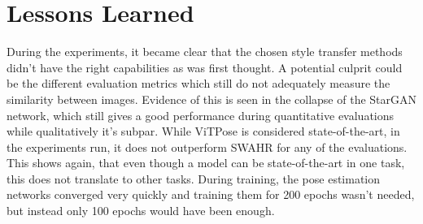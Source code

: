 \section{Lessons Learned}
During the experiments, it became clear that the chosen style transfer methods didn't have the right capabilities as was first thought.
A potential culprit could be the different evaluation metrics which still do not adequately measure the similarity between images.
Evidence of this is seen in the collapse of the StarGAN network, which still gives a good performance during quantitative evaluations while qualitatively it's subpar.
While ViTPose is considered state-of-the-art, in the experiments run, it does not outperform SWAHR for any of the evaluations.
This shows again, that even though a model can be state-of-the-art in one task, this does not translate to other tasks.
During training, the pose estimation networks converged very quickly and training them for 200 epochs wasn't needed, but instead only 100 epochs would have been enough.
